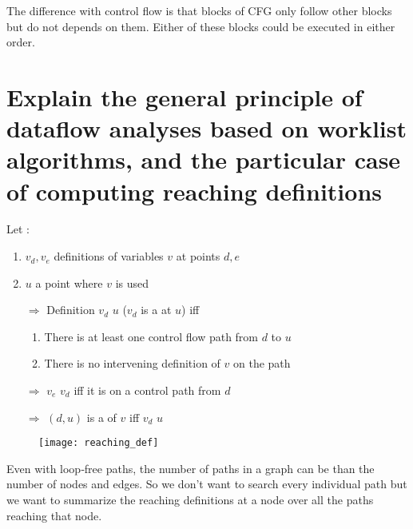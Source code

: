 The difference with control flow is that blocks of CFG only follow other blocks but do not depends on them. Either of these blocks could be executed in either order.

\newpage
\section{Explain the general principle of dataflow analyses based on worklist algorithms, and the particular case of computing reaching definitions}


\begin{minipage}{0.64\textwidth}
    Let :
    \begin{enumerate}
        \item $v_d, v_e$ definitions of variables $v$ at points $d,e$
        \item $u$ a point where $v$ is used
        \item[$\Rightarrow$] Definition $v_d$  $u$ ($v_d$ is a  at $u$) iff 
        \begin{enumerate}
            \item There is at least one control flow path from $d$ to $u$
            \item There is no intervening definition of $v$ on the path
        \end{enumerate}
        \item[$\Rightarrow$] $v_e$  $v_d$ iff it is on a control path from $d$
        \item[$\Rightarrow$] $(d,u)$ is a  of $v$ iff $v_d$  $u$
    \end{enumerate}
\end{minipage}
\hfill
\begin{minipage}{0.35\textwidth}
    \begin{figure}[H]
        \centering
        \texttt{[image: reaching\_def]}
    \end{figure}
\end{minipage}


Even with loop‐free paths, the number of paths in a graph can be  than the number of nodes and edges. So we don’t want to search every individual path but we want to summarize the reaching definitions at a node over all the paths reaching that node.

